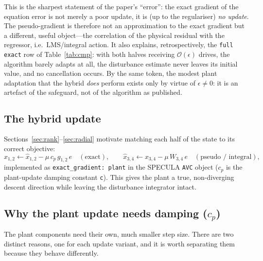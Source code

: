 \documentclass[11pt]{article}
\begin{document}
This is the sharpest statement of the paper's ``error'': the exact gradient
of the equation error is not merely a poor update, it is (up to the
regulariser) \emph{no update}. The pseudo-gradient is therefore not an
approximation to the exact gradient but a different, useful object---the
correlation of the physical residual with the regressor, i.e.\
LMS/integral action. It also explains, retrospectively, the
\texttt{full exact} row of Table~\ref{tab:cmp}: with both halves receiving
$\mathcal{O}(\epsilon)$ drives, the algorithm barely adapts at all, the
disturbance estimate never leaves its initial value, and no cancellation
occurs. By the same token, the modest plant adaptation that the hybrid
\emph{does} perform exists only by virtue of $\epsilon\neq0$: it is an
artefact of the safeguard, not of the algorithm as published.

\subsection{The hybrid update}
Sections~\ref{sec:rank}--\ref{sec:radial} motivate matching each half of the
state to its correct objective:
\begin{equation}
  \hat x_{1,2}\leftarrow \hat x_{1,2}-\mu\,c_{\!p}\,g_{1,2}\,e
  \quad(\text{exact}),\qquad
  \hat x_{3,4}\leftarrow \hat x_{3,4}-\mu\,W_{3,4}\,e
  \quad(\text{pseudo / integral}),
  \label{eq:hybrid}
\end{equation}
implemented as \texttt{exact\_gradient:\ plant} in the SPECULA
\texttt{AVC} object ($c_{\!p}$ is the plant-update damping constant
\texttt{c}). This gives the plant a true, non-diverging descent direction
while leaving the disturbance integrator intact.

\subsection{Why the plant update needs damping ($c_{\!p}$)}
\label{sec:damp}

The plant components need their own, much smaller step size. There are two
distinct reasons, one for each update variant, and it is worth separating
them because they behave differently.
\end{document}
